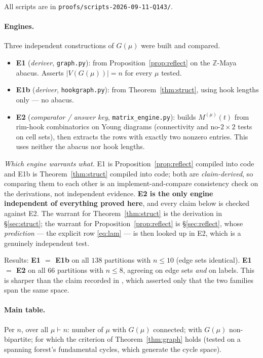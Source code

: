 \documentclass[11pt]{article}
\theoremstyle{definition}
\newcommand{\Z}{\mathbb{Z}}
\begin{document}
All scripts are in \verb|proofs/scripts-2026-09-11-Q143/|.

\paragraph{Engines.} Three independent constructions of $G(\mu)$ were built and compared.
\begin{itemize}
\item \textbf{E1} (\emph{deriver}, \verb|graph.py|): from Proposition~\ref{prop:reflect}
      on the $\Z$-Maya abacus. Asserts $|V(G(\mu))|=n$ for every $\mu$ tested.
\item \textbf{E1b} (\emph{deriver}, \verb|hookgraph.py|): from Theorem~\ref{thm:struct},
      using hook lengths only --- no abacus.
\item \textbf{E2} (\emph{comparator / answer key}, \verb|matrix_engine.py|): builds
      $M^{(\mu)}(t)$ from rim-hook combinatorics on Young diagrams (connectivity and
      no-$2\times2$ tests on cell sets), then extracts the rows with exactly two nonzero
      entries. This uses neither the abacus nor hook lengths.
\end{itemize}
\emph{Which engine warrants what.} E1 is Proposition~\ref{prop:reflect} compiled into code and
E1b is Theorem~\ref{thm:struct} compiled into code; both are \emph{claim-derived}, so comparing
them to each other is an implement-and-compare consistency check on the derivations, not
independent evidence. \textbf{E2 is the only engine independent of everything proved here}, and
every claim below is checked against E2. The warrant for Theorem~\ref{thm:struct} is the
derivation in \S\ref{sec:struct}; the warrant for Proposition~\ref{prop:reflect} is
\S\ref{sec:reflect}, whose \emph{prediction} --- the explicit row \eqref{eq:lam} --- is then
looked up in E2, which is a genuinely independent test.

Results: \textbf{E1 $=$ E1b} on all $138$ partitions with $n\le10$ (edge sets identical).
\textbf{E1 $=$ E2} on all $66$ partitions with $n\le8$, agreeing on edge sets \emph{and} on
labels. This is sharper than the claim recorded in \cite{Q140}, which asserted only that the
two families span the same space.

\paragraph{Main table.} Per $n$, over all $\mu\vdash n$: number of $\mu$ with $G(\mu)$
connected; with $G(\mu)$ non-bipartite; for which the criterion of Theorem~\ref{thm:graph}
holds (tested on a spanning forest's fundamental cycles, which generate the cycle space).
\end{document}
